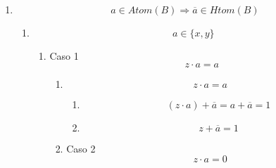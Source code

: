 \documentclass[
]{article}
\providecommand{\tightlist}{%
  \setlength{\itemsep}{0pt}\setlength{\parskip}{0pt}}
\begin{document}
\begin{enumerate}
\begin{enumerate}
\begin{enumerate}
\begin{enumerate}
\begin{enumerate}
\begin{enumerate}
            \begin{enumerate}
            \def\labelenumvii{\arabic{enumvii}.}
            \tightlist
            \item
              \[{{{({z + a})} \cdot \overline{a}} = {1 \cdot \overline{a}}} = \overline{a}\]
            \item
              \[{z \cdot \overline{a}} = \overline{a}\]
            \end{enumerate}
          \end{enumerate}
        \end{enumerate}
      \item
        \[{a \in \mathit{Atom}}{(B)}\Rightarrow{\overline{a} \in \mathit{Htom}}{(B)}\]

        \begin{enumerate}
        \def\labelenumv{\arabic{enumv}.}
        \item
          \[a \in {\{{x,y}\}}\]

          \begin{enumerate}
          \def\labelenumvi{\arabic{enumvi}.}
          \item
            Caso 1 \[{z \cdot a} = a\]

            \begin{enumerate}
            \def\labelenumvii{\arabic{enumvii}.}
            \item
              \[{z \cdot a} = a\]

              \begin{enumerate}
              \def\labelenumviii{\arabic{enumviii}.}
              \tightlist
              \item
                \[{{{({z \cdot a})} + \overline{a}} = {a + \overline{a}}} = 1\]
              \item
                \[{z + \overline{a}} = 1\]
              \end{enumerate}
            \item
              Caso 2 \[{z \cdot a} = 0\]


\end{enumerate}
\end{enumerate}
\end{enumerate}
\end{enumerate}
\end{enumerate}
\end{enumerate}
\end{enumerate}
\end{document}
